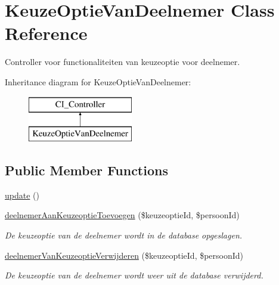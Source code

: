 \hypertarget{class_keuze_optie_van_deelnemer}{}\section{Keuze\+Optie\+Van\+Deelnemer Class Reference}
\label{class_keuze_optie_van_deelnemer}


Controller voor functionaliteiten van keuzeoptie voor deelnemer.  


Inheritance diagram for Keuze\+Optie\+Van\+Deelnemer\+:\begin{figure}[H]
\begin{center}
\leavevmode
\includegraphics[height=2.000000cm]{class_keuze_optie_van_deelnemer}
\end{center}
\end{figure}
\subsection*{Public Member Functions}
\begin{DoxyCompactItemize}
\item 
\mbox{\hyperlink{class_keuze_optie_van_deelnemer_a04438616b87ca22ac662c94abc043c39}{update}} ()
\item 
\mbox{\label{class_keuze_optie_van_deelnemer_af1516ec8cae4ca12ef73a5396c6df8e2}} 
\mbox{\hyperlink{class_keuze_optie_van_deelnemer_af1516ec8cae4ca12ef73a5396c6df8e2}{deelnemer\+Aan\+Keuzeoptie\+Toevoegen}} (\$keuzeoptie\+Id, \$persoon\+Id)
\begin{DoxyCompactList}\small\item\em De keuzeoptie van de deelnemer wordt in de database opgeslagen. \end{DoxyCompactList}\item 
\mbox{\label{class_keuze_optie_van_deelnemer_a9990c49ae295c91d1fa125b0d71d05d5}} 
\mbox{\hyperlink{class_keuze_optie_van_deelnemer_a9990c49ae295c91d1fa125b0d71d05d5}{deelnemer\+Van\+Keuzeoptie\+Verwijderen}} (\$keuzeoptie\+Id, \$persoon\+Id)
\begin{DoxyCompactList}\small\item\em De keuzeoptie van de deelnemer wordt weer uit de database verwijderd. \end{DoxyCompactList}\end{DoxyCompactItemize}


